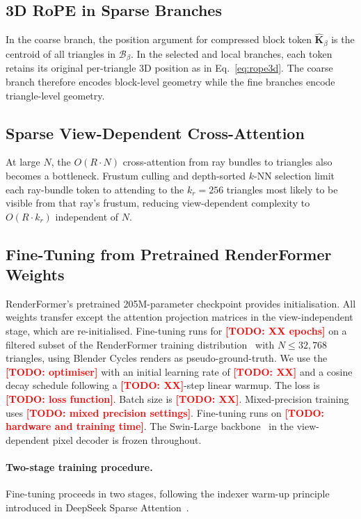 \documentclass{egpubl}
\newcommand{\RF}{RenderFormer\xspace}
\newcommand{\todo}[1]{\textcolor{red}{\textbf{[TODO: #1]}}}
\begin{document}
\subsection{3D RoPE in Sparse Branches}
\label{sec:rope}

In the coarse branch, the position argument for compressed block token
$\hat{\mathbf{K}}_\beta$ is the centroid of all triangles in
$\mathcal{B}_\beta$.
In the selected and local branches, each token retains its original
per-triangle 3D position as in Eq.~\ref{eq:rope3d}.
The coarse branch therefore encodes block-level geometry while the fine
branches encode triangle-level geometry.

\subsection{Sparse View-Dependent Cross-Attention}
\label{sec:viewdep}

At large $N$, the $O(R \cdot N)$ cross-attention from ray bundles to
triangles also becomes a bottleneck.
Frustum culling and depth-sorted $k$-NN selection limit each ray-bundle
token to attending to the $k_r = 256$ triangles most likely to be visible
from that ray's frustum, reducing view-dependent complexity to
$O(R \cdot k_r)$ independent of $N$.

\subsection{Fine-Tuning from Pretrained \RF Weights}
\label{sec:finetune}

\RF's pretrained 205M-parameter checkpoint provides initialisation.
All weights transfer except the attention projection matrices in the
view-independent stage, which are re-initialised.
Fine-tuning runs for \todo{XX epochs} on a filtered subset of the \RF
training distribution~\cite{deitke2022objaverse} with $N \leq 32{,}768$
triangles, using Blender Cycles renders as pseudo-ground-truth.
We use the \todo{optimiser} with an initial learning rate
of \todo{XX} and a cosine decay schedule following a \todo{XX}-step
linear warmup.
The loss is \todo{loss function}.
Batch size is \todo{XX}.
Mixed-precision training uses \todo{mixed precision settings}.
Fine-tuning runs on \todo{hardware and training time}.
The Swin-Large backbone~\cite{liu2021swin} in the view-dependent pixel
decoder is frozen throughout.

\paragraph{Two-stage training procedure.}
Fine-tuning proceeds in two stages, following the indexer warm-up principle
introduced in DeepSeek Sparse Attention~\cite{deepseek2025dsa}.
\end{document}
